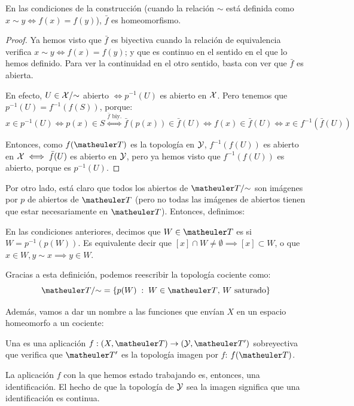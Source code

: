 \begin{prop}
	En las condiciones de la construcción (cuando la relación $\sim$ está definida como $x\sim y\iff f(x)=f(y)$), $\bar{f}$ es homeomorfismo.
	
	\begin{proof}
		Ya hemos visto que $\bar{f}$ es biyectiva cuando la relación de equivalencia verifica $x\sim y\iff f(x)=f(y)$; y que es continuo en el sentido en el que lo hemos definido. Para ver la continuidad en el otro sentido, basta con ver que $\bar{f}$ es abierta.
		
		En efecto, $U\in \mathcal{X}/\mathord{\sim}$ abierto $\iff p^{-1}(U)$ es abierto en $\mathcal{X}$. Pero tenemos que $p^{-1}(U)=f^{-1}(f(S))$, porque:
		\[x\in p^{-1}(U)\iff p(x)\in S\stackrel{\bar{f}\text{ biy.}}{\iff}\bar{f}(p(x))\in \bar{f}(U)\iff f(x)\in\bar{f}(U)\iff x\in f^{-1}(\bar{f}(U))\]
		
		Entonces, como $f(\T)$ es la topología en $\mathcal{Y}$, $f^{-1}(f(U))$ es abierto en $\mathcal{X}\iff \bar{f}(U)$ es abierto en $\mathcal{Y}$, pero ya hemos visto que $f^{-1}(f(U))$ es abierto, porque es $p^{-1}(U)$.
	\end{proof}
\end{prop}

Por otro lado, está claro que todos los abiertos de $\T/\mathord{\sim}$ son imágenes por $p$ de abiertos de $\T$ (pero no todas las imágenes de abiertos tienen que estar necesariamente en $\T$). Entonces, definimos:

\begin{defi}
	En las condiciones anteriores, decimos que $W\in\T$ es  si $W=p^{-1}(p(W))$. Es equivalente decir que $[x]\cap W\neq\emptyset\implies [x]\subset W$, o que $x\in W,y\sim x\implies y\in W$.
\end{defi}

Gracias a esta definición, podemos reescribir la topología cociente como:
\[\T/\mathord{\sim} = \{p(W)\midc W\in\T\text{, } W\text{ saturado}\}\]

Además, vamos a dar un nombre a las funciones que envían $X$ en un espacio homeomorfo a un cociente:

\begin{defi}[Identificación]
	Una  es una aplicación $f:(X,\T)\to (\mc{Y},\T')$ sobreyectiva que verifica que $\T'$ es la topología imagen por $f$: $f(\T)$.
\end{defi}

La aplicación $f$ con la que hemos estado trabajando es, entonces, una identificación. El hecho de que la topología de $\mathcal{Y}$ sea la imagen significa que una identificación es continua.


